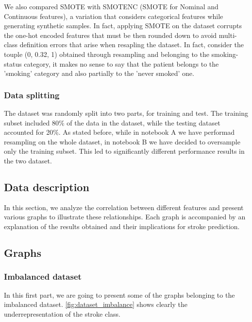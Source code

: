 \documentclass[twocolumn, 9pt]{extarticle}
\begin{document}
We also compared SMOTE with SMOTENC (SMOTE for Nominal and Continuous features), a variation that considers categorical features while generating synthetic samples. In fact, applying SMOTE on the dataset corrupts the one-hot encoded features that must be then rounded down to avoid multi-class definition errors that arise when resapling the dataset. In fact, consider the touple (0, 0.32, 1) obtained through resampling and belonging to the smoking-status category, it makes no sense to say that the patient belongs to the 'smoking' category and also partially to the 'never smoked' one.

\subsubsection{Data splitting}
The dataset was randomly split into two parts, for training and test. The training subset included 80\% of the data in the dataset, while the testing dataset accounted for 20\%. As stated before, while in notebook A we have performad resampling on the whole dataset, in notebook B we have decided to oversample only the training subset. This led to significantly different performance results in the two dataset.

\subsection{Data description}
In this section, we analyze the correlation between different features and present various graphs to illustrate these relationships. Each graph is accompanied by an explanation of the results obtained and their implications for stroke prediction.

\subsection{Graphs}

\subsubsection{Imbalanced dataset}
In this first part, we are going to present some of the graphs belonging to the imbalanced dataset.
\ref{fig:dataset_imbalance} shows clearly the underrepresentation of the stroke class.
\end{document}

